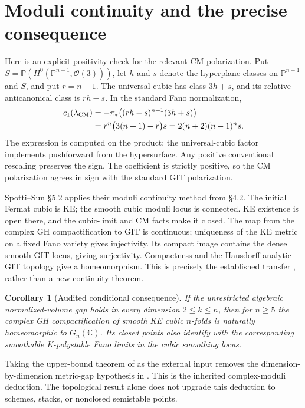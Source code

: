 \documentclass[11pt]{article}
\newtheorem{corollary}[proposition]{Corollary}
\newcommand{\C}{\mathbb C}
\newcommand{\PP}{\mathbb P}
\begin{document}
\section{Moduli continuity and the precise consequence}
Here is an explicit positivity check for the relevant CM polarization.
Put $S=\PP(H^0(\PP^{n+1},\mathcal O(3)))$, let $h$ and $s$ denote
the hyperplane classes on $\PP^{n+1}$ and $S$, and put $r=n-1$.
The universal cubic has class $3h+s$, and its relative anticanonical
class is $rh-s$. In the standard Fano normalization,
\[
\begin{split}
 c_1(\lambda_{\rm CM})
 &=-\pi_*\bigl((rh-s)^{n+1}(3h+s)\bigr)\\
 &=r^n\bigl(3(n+1)-r\bigr)s
 =2(n+2)(n-1)^n s.
\end{split}
\]
The expression is computed on the product; the universal-cubic factor
implements pushforward from the hypersurface. Any positive conventional
rescaling preserves the sign. The coefficient is strictly positive,
so the CM polarization agrees in sign with the standard GIT polarization.

Spotti--Sun \S5.2 applies their moduli continuity method from \S4.2.
The initial Fermat cubic is KE; the smooth cubic moduli locus is connected.
KE existence is open there, and the cubic-limit and CM facts make it
closed. The map from the complex GH compactification to GIT is continuous;
uniqueness of the KE metric on a fixed Fano variety gives injectivity.
Its compact image contains the dense smooth GIT locus, giving
surjectivity. Compactness and the Hausdorff analytic GIT topology give a
homeomorphism. This is precisely the established transfer
\cite[Theorem 1.3(2)]{SS}, rather than a new continuity theorem.

\begin{corollary}[Audited conditional consequence]
If the unrestricted algebraic normalized-volume gap holds in every
dimension $2\leq k\leq n$, then for $n\geq5$ the complex GH
compactification of smooth KE cubic $n$-folds is naturally homeomorphic
to $G_n(\C)$. Its closed points also identify with the corresponding
smoothable K-polystable Fano limits in the cubic smoothing locus.
\end{corollary}

Taking the upper-bound theorem of \cite{OAI} as the external input removes
the dimension-by-dimension metric-gap hypothesis in \cite[Theorem
1.3(2)]{SS}. This is the inherited complex-moduli deduction. The
topological result alone does not upgrade this deduction to schemes,
stacks, or nonclosed semistable points.
\end{document}
